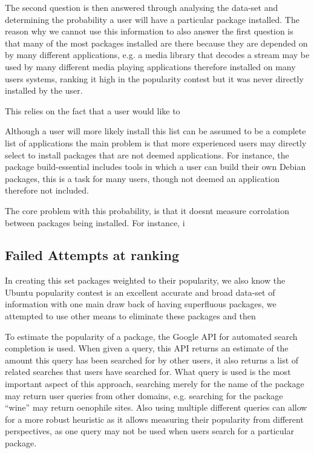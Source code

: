 The second question is then answered through analysing the data-set and determining the probability a user will have a particular package installed.
The reason why we cannot use this information to also answer the first question is that many of the most packages installed are there because they are depended on by many different applications,
e.g. a media library that decodes a stream may be used by many different media playing applications therefore installed on many users systems, 
ranking it high in the popularity contest but it was never directly installed by the user.


This relies on the fact that a user would like to 

Although a user will more likely install this list can be assumed to be a complete list of applications 
the main problem is that more experienced users may directly select to install packages that are not deemed applications.
For instance, the package build-essential includes tools in which a user can build their own Debian packages,
this is a task for many users, though not deemed an application therefore not included.

The core problem with this probability, is that it doesnt measure corrolation between packages being installed.
For instance, i


\subsection{Failed Attempts at ranking}
In creating this set packages weighted to their popularity, we also  know the Ubuntu popularity contest is an excellent accurate and broad data-set of information with one main draw back of having superfluous packages,
we attempted to use other means to eliminate these packages and then  

To estimate the popularity of a package, the Google API for automated search completion is used.
When given a query, this API returns an estimate of the amount this query has been searched for by other users,
it also returns a list of related searches that users have searched for.
What query is used is the most important aspect of this approach,
searching merely for the name of the package may return user queries from other domains, e.g. searching for the package ``wine'' may return oenophile sites.
Also using multiple different queries can allow for a more robust heuristic as it allows measuring their popularity from different perspectives,
as one query may not be used when users search for a particular package.

